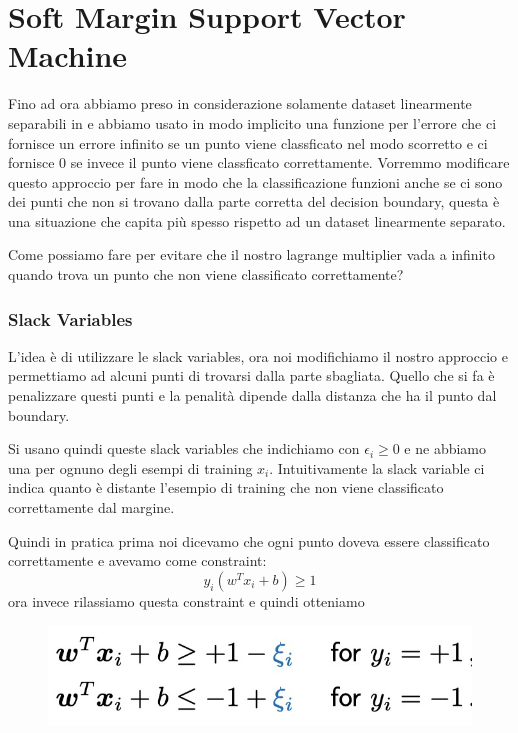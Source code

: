 \documentclass[14pt]{extreport}
\begin{document}
\section{Soft Margin Support Vector Machine}

Fino ad ora abbiamo preso in considerazione solamente dataset linearmente separabili in e abbiamo usato in modo implicito una funzione per l'errore
che ci fornisce un errore infinito se un punto viene classficato nel modo scorretto e ci fornisce 0 se invece il punto viene classficato
correttamente. Vorremmo modificare questo approccio per fare in modo che la classificazione funzioni anche se ci sono dei punti che non si trovano
dalla parte corretta del decision boundary, questa è una situazione che capita più spesso rispetto ad un dataset linearmente separato.

Come possiamo fare per evitare che il nostro lagrange multiplier vada a infinito quando trova un punto che non viene classificato correttamente?

\subsubsection{Slack Variables}

L'idea è di utilizzare le slack variables, ora noi modifichiamo il nostro approccio e permettiamo ad alcuni punti di trovarsi dalla parte sbagliata.
Quello che si fa è penalizzare questi punti e la penalità dipende dalla distanza che ha il punto dal boundary.

Si usano quindi queste slack variables che indichiamo con $\epsilon_i \geq 0$ e ne abbiamo una per ognuno degli esempi di training $x_i$.
Intuitivamente la slack variable ci indica quanto è distante l'esempio di training che non viene classificato correttamente dal margine.


Quindi in pratica prima noi dicevamo che ogni punto doveva essere classificato correttamente e avevamo come constraint: $$y_i(w^Tx_i+b) \geq 1$$ ora
invece rilassiamo questa constraint e quindi otteniamo

\begin{figure}[H]
\centering
\includegraphics[width=0.7\linewidth]{320.jpeg}
\end{figure}
\end{document}
